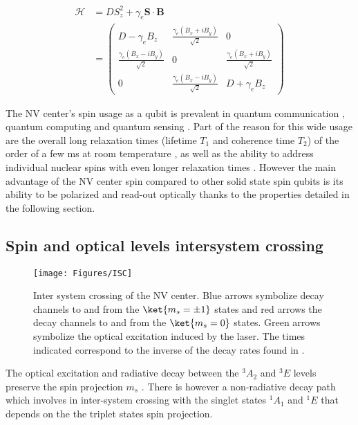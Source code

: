 \documentclass[a4paper,11pt]{report}
\begin{document}
\begin{align}
\label{NV spin Hamiltonian basic}
\mathcal{H}&=D S_z^2 + \gamma_e \mathbf{S} \cdot \mathbf{B} \\
&=\begin{pmatrix}
D-\gamma_e B_z & \frac{\gamma_e (B_x+iB_y)}{\sqrt{2}} & 0 \\
\frac{\gamma_e (B_x-iB_y)}{\sqrt{2}} & 0 & \frac{\gamma_e (B_x+iB_y)}{\sqrt{2}} \\
0 & \frac{\gamma_e (B_x-iB_y)}{\sqrt{2}} & D+\gamma_e B_z
\end{pmatrix}
\end{align}

\bigskip
The NV center's spin usage as a qubit is prevalent in quantum communication \citep{wehner2018quantum}, quantum computing \citep{de2021materials} and quantum sensing \citep{degen2017quantum}. Part of the reason for this wide usage are the overall long relaxation times (lifetime $T_1$ and coherence time $T_2$) of the order of a few ms at room temperature \citep{balasubramanian2009ultralong}, as well as the ability to address individual nuclear spins with even longer relaxation times \citep{awschalom2018quantum}. However the main advantage of the NV center spin compared to other solid state spin qubits is its ability to be polarized and read-out optically thanks to the properties detailed in the following section.


\subsection{Spin and optical levels intersystem crossing}
\label{sec ISC}
\begin{figure}[h!]
\centering
\texttt{[image: Figures/ISC]}
\caption{Inter system crossing of the NV center. Blue arrows symbolize decay channels to and from the $\ket{m_s=\pm 1}$ states and red arrows the decay channels to and from the $\ket{m_s=0}$ states. Green arrows symbolize the optical excitation induced by the laser. The times indicated correspond to the inverse of the decay rates found in \citep{gupta2016efficient}.}
\label{ISC}
\end{figure}

The optical excitation and radiative decay between the $^3A_2$ and $^3E$ levels preserve the spin projection $m_s$ \citep{robledo2011spin}. There is however a non-radiative decay path which involves in inter-system crossing with the singlet states $^1A_1$ and $^1E$ that depends on the the triplet states spin projection.
\end{document}
